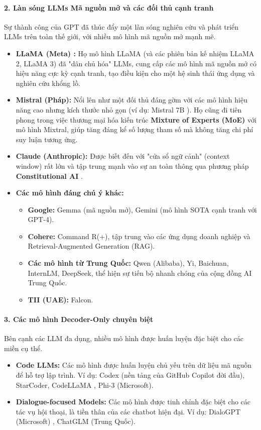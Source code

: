 \paragraph{2. Làn sóng LLMs Mã nguồn mở và các đối thủ cạnh tranh}
Sự thành công của GPT đã thúc đẩy một làn sóng nghiên cứu và phát triển LLMs trên toàn thế giới, với nhiều mô hình mã nguồn mở mạnh mẽ.
\begin{itemize}
    \item \textbf{LLaMA (Meta) \cite{touvron2023llama}:} Họ mô hình LLaMA (và các phiên bản kế nhiệm LLaMA 2, LLaMA 3) đã "dân chủ hóa" LLMs, cung cấp các mô hình mã nguồn mở có hiệu năng cực kỳ cạnh tranh, tạo điều kiện cho một hệ sinh thái ứng dụng và nghiên cứu khổng lồ.
    \item \textbf{Mistral (Pháp):} Nổi lên như một đối thủ đáng gờm với các mô hình hiệu năng cao nhưng kích thước nhỏ gọn (ví dụ: Mistral 7B \cite{jiang2023mistral}). Họ cũng đi tiên phong trong việc thương mại hóa kiến trúc \textbf{Mixture of Experts (MoE)} với mô hình Mixtral, giúp tăng đáng kể số lượng tham số mà không tăng chi phí suy luận tương ứng.
    \item \textbf{Claude (Anthropic):} Được biết đến với "cửa sổ ngữ cảnh" (context window) rất lớn và tập trung mạnh vào sự an toàn thông qua phương pháp \textbf{Constitutional AI} \cite{bai2022constitutional}.
    \item \textbf{Các mô hình đáng chú ý khác:}
        \begin{itemize}
            \item \textbf{Google:} Gemma (mã nguồn mở), Gemini (mô hình SOTA cạnh tranh với GPT-4).
            \item \textbf{Cohere:} Command R(+), tập trung vào các ứng dụng doanh nghiệp và Retrieval-Augmented Generation (RAG).
            \item \textbf{Các mô hình từ Trung Quốc:} Qwen (Alibaba), Yi, Baichuan, InternLM, DeepSeek, thể hiện sự tiến bộ nhanh chóng của cộng đồng AI Trung Quốc.
            \item \textbf{TII (UAE):} Falcon.
        \end{itemize}
\end{itemize}

\paragraph{3. Các mô hình Decoder-Only chuyên biệt}
Bên cạnh các LLM đa dụng, nhiều mô hình được huấn luyện đặc biệt cho các miền cụ thể.
\begin{itemize}
    \item \textbf{Code LLMs:} Các mô hình được huấn luyện chủ yếu trên dữ liệu mã nguồn để hỗ trợ lập trình. Ví dụ: Codex \cite{chen2021evaluating} (nền tảng của GitHub Copilot đời đầu), StarCoder\cite{li2023starcoder}, CodeLLaMA \cite{roziere2023code}, Phi-3 (Microsoft).
    \item \textbf{Dialogue-focused Models:} Các mô hình được tinh chỉnh đặc biệt cho các tác vụ hội thoại, là tiền thân của các chatbot hiện đại. Ví dụ: DialoGPT (Microsoft) \cite{zhang2019dialogpt}, ChatGLM (Trung Quốc).
\end{itemize}

